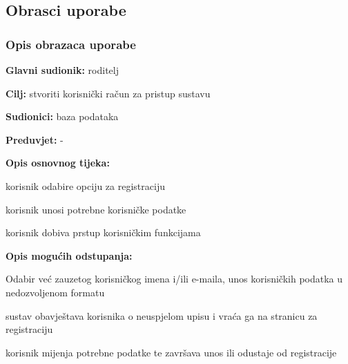 			\eject 
			
			
				
			\subsection{Obrasci uporabe}
				
				
				\subsubsection{Opis obrazaca uporabe}
					

					\noindent {}
					\begin{packed_item}
	
						\item \textbf{Glavni sudionik: }roditelj
						\item  \textbf{Cilj:} stvoriti korisnički račun za pristup sustavu
						\item  \textbf{Sudionici:} baza podataka
						\item  \textbf{Preduvjet:} -
						\item  \textbf{Opis osnovnog tijeka:}
						
						\item[] \begin{packed_enum}
	
							\item korisnik odabire opciju za registraciju
							\item korisnik unosi potrebne korisničke podatke
							\item korisnik dobiva prstup korisničkim funkcijama

						\end{packed_enum}
						
						\item  \textbf{Opis mogućih odstupanja:}
						
						\item[] \begin{packed_item}
	
							\item[2.a] Odabir već zauzetog korisničkog imena i/ili e-maila, unos korisničkih podatka u nedozvoljenom formatu
							\item[] \begin{packed_enum}
								
								\item sustav obavještava korisnika o neuspjelom upisu i vraća ga na stranicu za registraciju
								\item korisnik mijenja potrebne podatke te završava unos ili odustaje od registracije
							\end{packed_enum}
							
						\end{packed_item}
					\end{packed_item}

